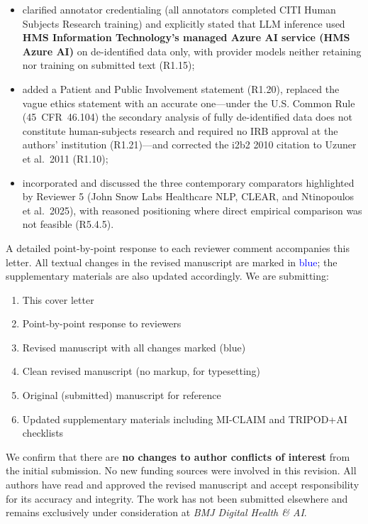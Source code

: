 \documentclass[11pt,letterpaper]{article}
\begin{document}
\begin{itemize}
    \item clarified annotator credentialing (all annotators completed CITI Human Subjects Research training) and explicitly stated that LLM inference used \textbf{HMS Information Technology's managed Azure AI service (HMS Azure AI)} on de-identified data only, with provider models neither retaining nor training on submitted text (R1.15);
    \item added a Patient and Public Involvement statement (R1.20), replaced the vague ethics statement with an accurate one---under the U.S. Common Rule (45~CFR~46.104) the secondary analysis of fully de-identified data does not constitute human-subjects research and required no IRB approval at the authors' institution (R1.21)---and corrected the i2b2 2010 citation to Uzuner et al.\ 2011 (R1.10);
    \item incorporated and discussed the three contemporary comparators highlighted by Reviewer 5 (John Snow Labs Healthcare NLP, CLEAR, and Ntinopoulos et al.\ 2025), with reasoned positioning where direct empirical comparison was not feasible (R5.4.5).
\end{itemize}

\medskip

A detailed point-by-point response to each reviewer comment accompanies this letter. All textual changes in the revised manuscript are marked in \textcolor{blue}{blue}; the supplementary materials are also updated accordingly. We are submitting:

\begin{enumerate}
    \item This cover letter
    \item Point-by-point response to reviewers
    \item Revised manuscript with all changes marked (blue)
    \item Clean revised manuscript (no markup, for typesetting)
    \item Original (submitted) manuscript for reference
    \item Updated supplementary materials including MI-CLAIM and TRIPOD+AI checklists
\end{enumerate}

\medskip

We confirm that there are \textbf{no changes to author conflicts of interest} from the initial submission. No new funding sources were involved in this revision. All authors have read and approved the revised manuscript and accept responsibility for its accuracy and integrity. The work has not been submitted elsewhere and remains exclusively under consideration at \textit{BMJ Digital Health \& AI}.
\end{document}
